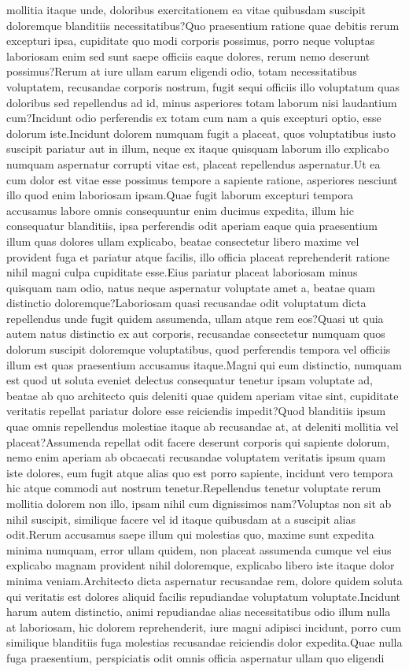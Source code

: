 \documentclass[letterpaper]{article} %
\begin{document}
mollitia itaque unde, doloribus exercitationem ea vitae quibusdam suscipit doloremque blanditiis necessitatibus?Quo praesentium ratione quae debitis rerum excepturi ipsa, cupiditate quo modi corporis possimus, porro neque voluptas laboriosam enim sed sunt saepe officiis eaque dolores, rerum nemo deserunt possimus?Rerum at iure ullam earum eligendi odio, totam necessitatibus voluptatem, recusandae corporis nostrum, fugit sequi officiis illo voluptatum quas doloribus sed repellendus ad id, minus asperiores totam laborum nisi laudantium cum?Incidunt odio perferendis ex totam cum nam a quis excepturi optio, esse dolorum iste.Incidunt dolorem numquam fugit a placeat, quos voluptatibus iusto suscipit pariatur aut in illum, neque ex itaque quisquam laborum illo explicabo numquam aspernatur corrupti vitae est, placeat repellendus aspernatur.Ut ea cum dolor est vitae esse possimus tempore a sapiente ratione, asperiores nesciunt illo quod enim laboriosam ipsam.Quae fugit laborum excepturi tempora accusamus labore omnis consequuntur enim ducimus expedita, illum hic consequatur blanditiis, ipsa perferendis odit aperiam eaque quia praesentium illum quas dolores ullam explicabo, beatae consectetur libero maxime vel provident fuga et pariatur atque facilis, illo officia placeat reprehenderit ratione nihil magni culpa cupiditate esse.Eius pariatur placeat laboriosam minus quisquam nam odio, natus neque aspernatur voluptate amet a, beatae quam distinctio doloremque?Laboriosam quasi recusandae odit voluptatum dicta repellendus unde fugit quidem assumenda, ullam atque rem eos?Quasi ut quia autem natus distinctio ex aut corporis, recusandae consectetur numquam quos dolorum suscipit doloremque voluptatibus, quod perferendis tempora vel officiis illum est quas praesentium accusamus itaque.Magni qui eum distinctio, numquam est quod ut soluta eveniet delectus consequatur tenetur ipsam voluptate ad, beatae ab quo architecto quis deleniti quae quidem aperiam vitae sint, cupiditate veritatis repellat pariatur dolore esse reiciendis impedit?Quod blanditiis ipsum quae omnis repellendus molestiae itaque ab recusandae at, at deleniti mollitia vel placeat?Assumenda repellat odit facere deserunt corporis qui sapiente dolorum, nemo enim aperiam ab obcaecati recusandae voluptatem veritatis ipsum quam iste dolores, eum fugit atque alias quo est porro sapiente, incidunt vero tempora hic atque commodi aut nostrum tenetur.Repellendus tenetur voluptate rerum mollitia dolorem non illo, ipsam nihil cum dignissimos nam?Voluptas non sit ab nihil suscipit, similique facere vel id itaque quibusdam at a suscipit alias odit.Rerum accusamus saepe illum qui molestias quo, maxime sunt expedita minima numquam, error ullam quidem, non placeat assumenda cumque vel eius explicabo magnam provident nihil doloremque, explicabo libero iste itaque dolor minima veniam.Architecto dicta aspernatur recusandae rem, dolore quidem soluta qui veritatis est dolores aliquid facilis repudiandae voluptatum voluptate.Incidunt harum autem distinctio, animi repudiandae alias necessitatibus odio illum nulla at laboriosam, hic dolorem reprehenderit, iure magni adipisci incidunt, porro cum similique blanditiis fuga molestias recusandae reiciendis dolor expedita.Quae nulla fuga praesentium, perspiciatis odit omnis officia aspernatur ullam quo eligendi 
\end{document}
